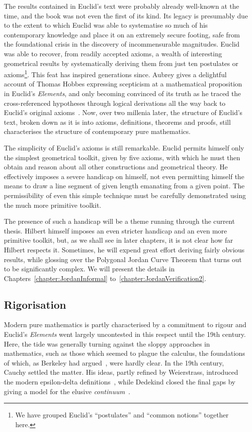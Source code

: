 The results contained in Euclid's text were probably already well-known at the time, and the book was not even the first of its kind. Its legacy is presumably due to the extent to which Euclid was able to systematise so much of his contemporary knowledge and place it on an extremely secure footing, safe from the foundational crisis in the discovery of incommensurable magnitudes. Euclid was able to recover, from readily accepted axioms, a wealth of interesting geometrical results by systematically deriving them from just ten postulates or axioms\footnote{We have grouped Euclid's ``postulates'' and ``common notions'' together here.}. This feat has inspired generations since. Aubrey gives a delightful account of Thomas Hobbes expressing scepticism at a mathematical proposition in Euclid's \emph{Elements}, and only becoming convinced of its truth as he traced the cross-referenced hypotheses through logical derivations all the way back to Euclid's original axioms~\cite{ElementaryGeometryRoe}. Now, over two millenia later, the structure of Euclid's text, broken down as it is into axioms, definitions, theorems and proofs, still characterises the structure of contemporary pure mathematics.

The simplicity of Euclid's axioms is still remarkable. Euclid permits himself only the simplest geometrical toolkit, given by five axioms, with which he must then obtain and reason about all other constructions and geometrical theory. He effectively imposes a severe handicap on himself, not even permitting himself the means to draw a line segment of given length emanating from a given point. The permissibility of even this simple technique must be carefully demonstrated using the much more primitive toolkit.

The presence of such a handicap will be a theme running through the current thesis. Hilbert himself imposes an even stricter handicap and an even more primitive toolkit, but, as we shall see in later chapters, it is not clear how far Hilbert respects it. Sometimes, he will expend great effort deriving fairly obvious results, while glossing over the Polygonal Jordan Curve Theorem that turns out to be significantly complex. We will present the details in Chapters~\ref{chapter:JordanInformal} to~\ref{chapter:JordanVerification2}.

\subsection{Rigorisation}
Modern pure mathematics is partly characterised by a commitment to rigour and Euclid's \emph{Elements} went largely uncontested in this respect until the 19th century. Here, the tide was generally turning against the sloppy approaches in mathematics, such as those which seemed to plague the calculus, the foundations of which, as Berkeley had argued~\cite{BerkeleyNewton}, were hardly clear. In the 19th century, Cauchy settled the matter. His ideas, partly refined by Weierstrass, introduced the modern epsilon-delta definitions~\cite{RigorousCalculus}, while Dedekind closed the final gaps by giving a model for the elusive \emph{continuum}~\cite{DedekindsCuts}.

